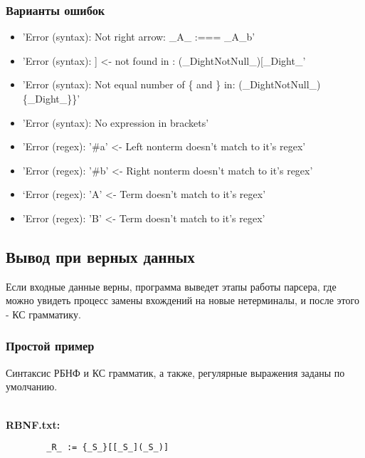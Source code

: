 \documentclass[12pt]{article}
\begin{document}
    \subsubsection*{Варианты ошибок}
    \begin{itemize}
        \item 'Error (syntax): Not right arrow: \_A\_ :=== \_A\_b'
        \item 'Error (syntax): ] <- not found in : (\_DightNotNull\_)[\_Dight\_'
        \item 'Error (syntax): Not equal number of \{ and \}   in: (\_DightNotNull\_)\{\_Dight\_\}\}'
        \item 'Error (syntax): No expression in brackets'
        \item 'Error (regex): '\#a' <- Left nonterm doesn't match to it's regex'
        \item 'Error (regex): '\#b' <- Right nonterm doesn't match to it's regex'
        \item ‘Error (regex): 'A' <- Term doesn't match to it's regex’
        \item 'Error (regex): 'B' <- Term doesn't match to it's regex'
    \end{itemize}

    \subsection{Вывод при верных данных}

    Если входные данные верны, программа выведет этапы работы парсера, где можно увидеть процесс замены вхождений на новые нетерминалы, и после этого - КС грамматику.

    \clearpage


    \subsubsection*{\large Простой пример}
    Синтаксис РБНФ и КС грамматик, а также, регулярные выражения заданы по умолчанию.

    \hfill \\
    {\bfseries RBNF.txt:}
    \begin{lstlisting}
        _R_ := {_S_}[[_S_](_S_)]
    \end{lstlisting}
\end{document}
